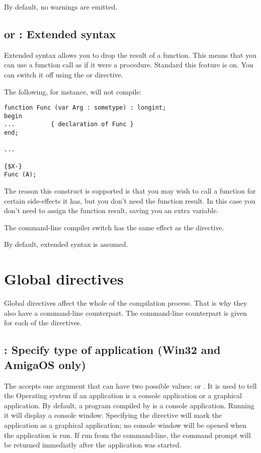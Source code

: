 By default, no warnings are emitted.

\subsection{ or  : Extended syntax}

Extended syntax allows you to drop the result of a function. This means that
you can use a function call as if it were a procedure. Standard this feature
is on. You can switch it off using the  or
directive.

The following, for instance, will not compile:
\begin{verbatim}
function Func (var Arg : sometype) : longint;
begin
...          { declaration of Func }
end;

...

{$X-}
Func (A);
\end{verbatim}
The reason this construct is supported is that you may wish to call a
function for certain side-effects it has, but you don't need the function
result. In this case you don't need to assign the function result, saving
you an extra variable.

The command-line compiler switch  has the same effect as the
 directive.

By default, extended syntax is assumed.

\section{Global directives}
\label{se:GlobalSwitch}
Global directives affect the whole of the compilation process. That is why
they also have a command-line counterpart. The command-line counterpart is
given for each of the directives.

\subsection{ : Specify type of application (Win32 and AmigaOS only)}

The  accepts one argument that can have two possible
values:  or . It is used to tell the \windows
Operating system if an application is a console application or a graphical
application. By default, a program compiled by \fpc is a console
application. Running it will display a console window. Specifying the
 directive will mark the application as a graphical
application; no console window will be opened when the application is run.
If run from the command-line, the command prompt will be returned immediatly
after the application was started.

